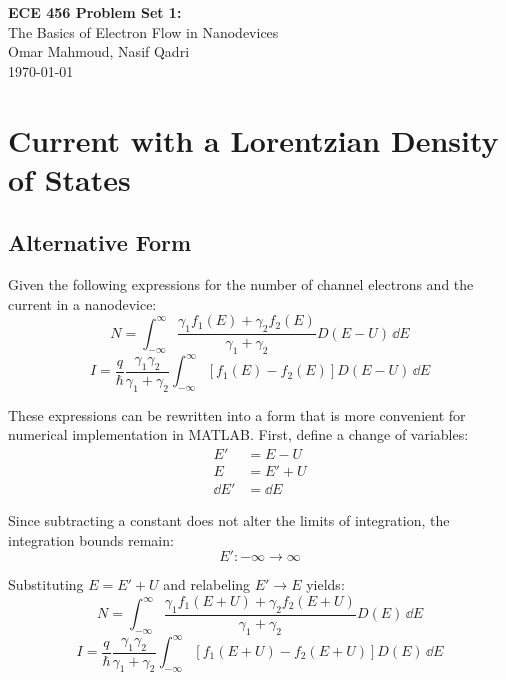 \documentclass[a4paper, 10pt]{article}
\begin{document}
\begin{titlepage}
    \vspace*{\fill}
    \begin{center}
        \Huge\textbf{ECE 456 Problem Set 1:\\}
        The Basics of Electron Flow in Nanodevices\\
        \vspace{1cm}
        \Large Omar Mahmoud, Nasif Qadri\\
        \vspace{0.5cm}
        \normalsize \today
    \end{center}
    \vspace*{\fill}
\end{titlepage}

\section{Current with a Lorentzian Density of States}

\subsection{Alternative Form}

Given the following expressions for the number of channel electrons and the current in a nanodevice:
\begin{equation}
    N = \int_{-\infty}^{\infty}
    \frac{\gamma_1 f_1(E) + \gamma_2 f_2(E)}{\gamma_1 + \gamma_2}
    D(E-U)\, \dd{E}
\end{equation}
\begin{equation}
    I = \frac{q}{\hbar}
    \frac{\gamma_1 \gamma_2}{\gamma_1 + \gamma_2}
    \int_{-\infty}^{\infty}
    [f_1(E) - f_2(E)] D(E-U)\, \dd{E}
\end{equation}

These expressions can be rewritten into a form that is more convenient for numerical implementation in MATLAB. First, define a change of variables:
\begin{align*}
	E' &= E - U \\
	E &= E' + U \\
	\dd{E'} &= \dd{E}
\end{align*}

Since subtracting a constant does not alter the limits of integration, the integration bounds remain:
\[
    E' : -\infty \rightarrow \infty
\]

Substituting $E = E' + U$ and relabeling $E' \rightarrow E$ yields:
\begin{equation}\label{eq:num_e2}
    N = \int_{-\infty}^{\infty}
    \frac{\gamma_1 f_1(E+U) + \gamma_2 f_2(E+U)}{\gamma_1 + \gamma_2}
    D(E)\, \dd{E}
\end{equation}
\begin{equation}\label{eq:current2}
    I = \frac{q}{\hbar}
    \frac{\gamma_1 \gamma_2}{\gamma_1 + \gamma_2}
    \int_{-\infty}^{\infty}
    [f_1(E+U) - f_2(E+U)] D(E)\, \dd{E}
\end{equation}
\end{document}
